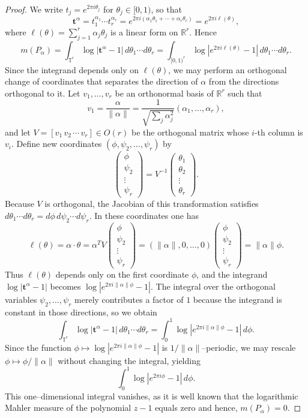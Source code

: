 \documentclass[table]{amsart}
\numberwithin{equation}{section}
\begin{document}
\begin{proof}
We write $t_j = e^{2\pi i \theta_j}$ for $\theta_j \in [0,1)$, so that
\[
\mathbf{t}^\alpha = t_1^{\alpha_1}\cdots t_r^{\alpha_r}
= e^{2\pi i (\alpha_1 \theta_1 + \cdots + \alpha_r \theta_r)}
= e^{2\pi i \ell(\theta)},
\]
where $\ell(\theta) = \sum_{j=1}^r \alpha_j \theta_j$ is a linear form on $\mathbb{R}^r$.
Hence
\[
m(P_\alpha)
= \int_{\mathbb{T}^r} \log|\mathbf{t}^\alpha - 1|\, d\theta_1\cdots d\theta_r
= \int_{[0,1)^r} \log|e^{2\pi i \ell(\theta)} - 1|\, d\theta_1\cdots d\theta_r.
\]
Since the integrand depends only on $\ell(\theta)$, we may perform an orthogonal change of coordinates
that separates the direction of $\alpha$ from the directions orthogonal to it.
Let $v_1,\dots,v_r$ be an orthonormal basis of $\mathbb{R}^r$ such that
\[
v_1 = \frac{\alpha}{\|\alpha\|} =
\frac{1}{\sqrt{\sum_j \alpha_j^2}} (\alpha_1,\dots,\alpha_r),
\]
and let $V=[v_1\,v_2\,\cdots\,v_r]\in O(r)$ be the orthogonal matrix whose $i$-th column is $v_i$.
Define new coordinates $(\phi,\psi_2,\dots,\psi_r)$ by
\[
\begin{pmatrix}
\phi \\ \psi_2 \\ \vdots \\ \psi_r
\end{pmatrix}
= V^{-1}
\begin{pmatrix}
\theta_1 \\ \theta_2 \\ \vdots \\ \theta_r
\end{pmatrix}.
\]
Because $V$ is orthogonal, the Jacobian of this transformation satisfies
$d\theta_1\cdots d\theta_r = d\phi\,d\psi_2\cdots d\psi_r$.
In these coordinates one has
\[
\ell(\theta) = \alpha \cdot \theta
= \alpha^{\!T} V
\begin{pmatrix}
\phi \\ \psi_2 \\ \vdots \\ \psi_r
\end{pmatrix}
= (\|\alpha\|, 0, \dots, 0)
\begin{pmatrix}
\phi \\ \psi_2 \\ \vdots \\ \psi_r
\end{pmatrix}
= \|\alpha\| \phi.
\]
Thus $\ell(\theta)$ depends only on the first coordinate $\phi$,
and the integrand $\log|\mathbf{t}^\alpha - 1|$ becomes
$\log|e^{2\pi i \|\alpha\| \phi} - 1|$.
The integral over the orthogonal variables $\psi_2,\dots,\psi_r$
merely contributes a factor of $1$ because the integrand is constant in those directions,
so we obtain
\[
\int_{\mathbb{T}^r} \log|\mathbf{t}^\alpha - 1|\, d\theta_1\cdots d\theta_r
= \int_0^1 \log|e^{2\pi i \|\alpha\| \phi} - 1|\, d\phi.
\]
Since the function $\phi \mapsto \log|e^{2\pi i \|\alpha\| \phi} - 1|$ is $1/\|\alpha\|$–periodic,
we may rescale $\phi \mapsto \phi / \|\alpha\|$ without changing the integral, yielding
\[
\int_0^1 \log|e^{2\pi i \phi} - 1|\, d\phi.
\]
This one–dimensional integral vanishes, as it is well known that the logarithmic Mahler measure of the polynomial
$z-1$ equals zero and hence,
$m(P_\alpha)=0$.
\end{proof}
\end{document}

